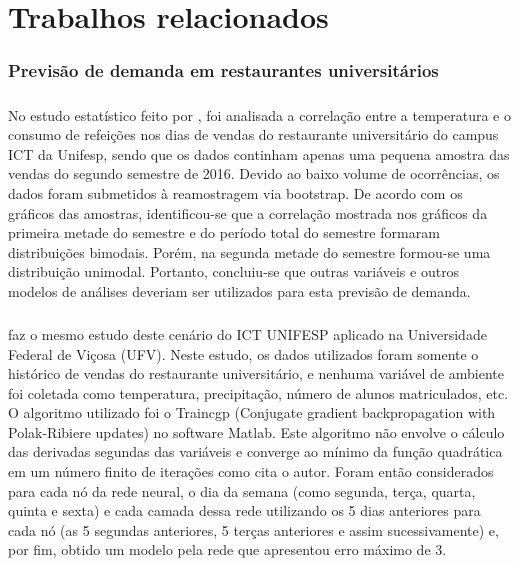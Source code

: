 \documentclass[	12pt, Times, openright, twoside, a4paper, english, brazil]{abntex2}
\begin{document}
  \chapter{Trabalhos relacionados}
    \subsection{Previsão de demanda em restaurantes universitários}
        \paragraph*{} No estudo estatístico feito por \cite{Landim2016}, foi analisada a correlação entre a temperatura e o consumo de refeições nos dias de vendas do restaurante universitário do campus ICT da Unifesp, sendo que os dados continham apenas uma pequena amostra das vendas do segundo semestre de 2016. Devido ao baixo volume de ocorrências, os dados foram submetidos à reamostragem via bootstrap. De acordo com os gráficos das amostras, identificou-se que a correlação mostrada nos gráficos da primeira metade do semestre e do período total do semestre formaram distribuições bimodais. Porém, na segunda metade do semestre formou-se uma distribuição unimodal. Portanto, concluiu-se que outras variáveis e outros modelos de análises deveriam ser utilizados para esta previsão de demanda.
        
        \paragraph*{} \cite{Lopes2008} faz o mesmo estudo deste cenário do ICT UNIFESP aplicado na Universidade Federal de Viçosa (UFV). Neste estudo, os dados utilizados foram somente o histórico de vendas do restaurante universitário, e nenhuma variável de ambiente foi coletada como temperatura, precipitação, número de alunos matriculados, etc. O algoritmo utilizado foi o Traincgp (Conjugate gradient backpropagation with Polak-Ribiere updates) no software Matlab. Este algoritmo não envolve o cálculo das derivadas segundas das variáveis e converge ao mínimo da função quadrática em um número finito de iterações como cita o autor. Foram então considerados para cada nó da rede neural, o dia da semana (como segunda, terça, quarta, quinta e sexta) e cada camada dessa rede utilizando os 5 dias anteriores para cada nó (as 5 segundas anteriores, 5 terças anteriores e assim sucessivamente) e, por fim, obtido um modelo pela rede que apresentou erro máximo de 3.
        
\end{document}
